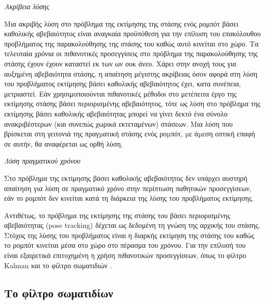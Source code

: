 \begin{gg_box}
\begin{remark}
  \label{remark:01_01_02_02:01}
  \textit{Ακρίβεια λύσης}

  Μια ακριβής λύση στο πρόβλημα της εκτίμησης της στάσης ενός ρομπότ βάσει
  καθολικής αβεβαιότητος είναι αναγκαία προϋπόθεση για την επίλυση του
  επακόλουθου προβλήματος της παρακολούθησης της στάσης του καθώς αυτό κινείται
  στο χώρο. Τα τελευταία χρόνια οι πιθανοτικές προσεγγίσεις στο πρόβλημα της
  παρακολούθησης της στάσης έχουν έχουν καταστεί εκ των ων ουκ άνευ. Χάρει στην
  ανοχή τους για αυξημένη αβεβαιότητα στάσης, η απαίτηση μέγιστης ακρίβειας
  όσον αφορά στη λύση του προβλήματος εκτίμησης βάσει καθολικής αβεβαιότητος
  έχει, κατα συνέπεια, μετριαστεί. Εάν χρησιμοποιούνται πιθανοτικές μέθοδοι στο
  μετέπειτα έργο της εκτίμησης στάσης βάσει περιορισμένης αβεβαιότητος, τότε ως
  λύση στο πρόβλημα της εκτίμησης βάσει καθολικής αβεβαιότητας μπορεί να γίνει
  δεκτό ένα σύνολο ανακριβέστερων (και συνεπώς χωρικά εκτεταμένων) στάσεων. Μια
  λύση που βρίσκεται στη γειτονιά της πραγµατική στάσης ενός ροµπότ, µε άµεση
  οπτική επαφή σε αυτήν, θα αναφέρεται ως ορθή λύση.
\end{remark}
\end{gg_box}


\begin{gg_box}
\begin{remark}
  \textit{Λύση πραγματικού χρόνου}
  \label{remark:01_01_02_02:02}

  Στο πρόβλημα της εκτίμησης βάσει καθολικής αβεβαιότητος δεν υπάρχει αυστηρή
  απαίτηση για λύση σε πραγματικό χρόνο στην περίπτωση παθητικών προσεγγίσεων,
  εάν το ρομπότ δεν κινείται κατά τη διάρκεια της λύσης του προβλήματος
  εκτίμησης.
\end{remark}
\end{gg_box}

Αντιθέτως, το πρόβλημα της εκτίμησης της στάσης του βάσει περιορισμένης
αβεβαιότητας (pose tracking) δέχεται ως δεδομένη τη γνώση της αρχικής του
στάσης. Στόχος της λύσης του προβλήματος είναι η διαρκής εκτίμηση της στάσης
του καθώς το ρομπότ κινείται μέσα στο χώρο στο πέρασμα του χρόνου. Για την
επίλυσή του είναι εξαιρετικά επιτυχημένη η χρήση πιθανοτικών προσεγγίσεων, όπως
το φίλτρο Kalman \cite{Maybeck1979} και το φίλτρο σωματιδιών
\cite{Thrun2002a,Gustafsson2002}.

\subsection{Το φίλτρο σωματιδίων}
\label{subsec:01_01_02_3}

